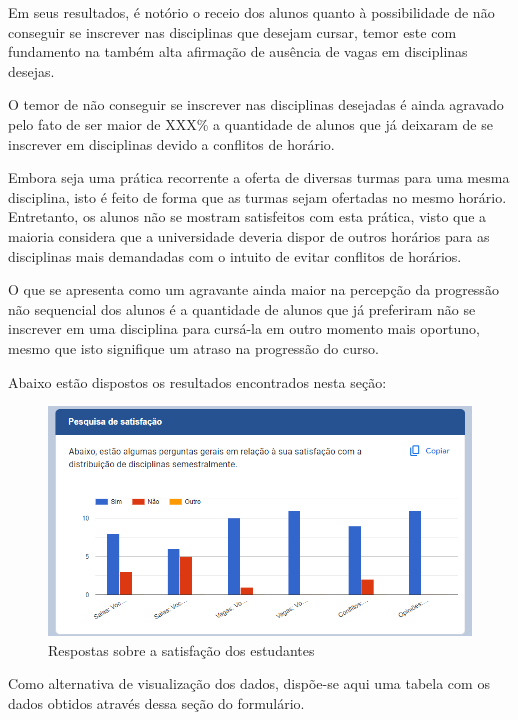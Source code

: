         Em seus resultados, é notório o receio dos alunos quanto à possibilidade de não conseguir se inscrever nas disciplinas que desejam cursar, temor este com fundamento na também alta afirmação de ausência de vagas em disciplinas desejas.

        O temor de não conseguir se inscrever nas disciplinas desejadas é ainda agravado pelo fato de ser maior de XXX\% a quantidade de alunos que já deixaram de se inscrever em disciplinas devido a conflitos de horário.

        Embora seja uma prática recorrente a oferta de diversas turmas para uma mesma disciplina, isto é feito de forma que as turmas sejam ofertadas no mesmo horário. Entretanto, os alunos não se mostram satisfeitos com esta prática, visto que a maioria considera que a universidade deveria dispor de outros horários para as disciplinas mais demandadas com o intuito de evitar conflitos de horários.

        O que se apresenta como um agravante ainda maior na percepção da progressão não sequencial dos alunos é a quantidade de alunos que já preferiram não se inscrever em uma disciplina para cursá-la em outro momento mais oportuno, mesmo que isto signifique um atraso na progressão do curso.

        Abaixo estão dispostos os resultados encontrados nesta seção:

        \begin{figure}[htbp]\centering
            \caption{\label{fig:2_Satisfacao} Respostas sobre a satisfação dos estudantes}
            \includegraphics[scale=0.8]{files/img/forms/2.0-Satisfacao.png}
        \end{figure} %

        Como alternativa de visualização dos dados, dispõe-se aqui uma tabela com os dados obtidos através dessa seção do formulário.

